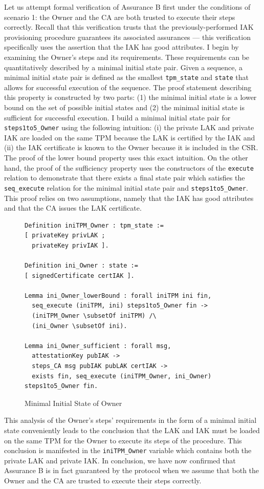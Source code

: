 \documentclass[runningheads]{llncs}
\begin{document}
Let us attempt formal verification of Assurance B first under the conditions of scenario 1: the Owner and the CA are both trusted to execute their steps correctly. Recall that this verification trusts that the previously-performed IAK provisioning procedure guarantees its associated assurances --- this verification specifically uses the assertion that the IAK has good attributes.
I begin by examining the Owner's steps and its requirements. These requirements can be quantitatively described by a minimal initial state pair. Given a sequence, a minimal initial state pair is defined as the smallest \verb|tpm_state| and \verb|state| that allows for successful execution of the sequence. The proof statement describing this property is constructed by two parts: (1) the minimal initial state is a lower bound on the set of possible initial states and (2) the minimal initial state is sufficient for successful execution. I build a minimal initial state pair for \verb|steps1to5_Owner| using the following intuition: (i) the private LAK and private IAK are loaded on the same TPM because the LAK is certified by the IAK and (ii) the IAK certificate is known to the Owner because it is included in the CSR.  
The proof of the lower bound property uses this exact intuition.
On the other hand, the proof of the sufficiency property uses the constructors of the \verb|execute| relation to demonstrate that there exists a final state pair which satisfies the \verb|seq_execute| relation for the minimal initial state pair and \verb|steps1to5_Owner|. This proof relies on two assumptions, namely that the IAK has good attributes and that the CA issues the LAK certificate.
\begin{figure}[h]
\begin{lstlisting}[language=Coq]
Definition iniTPM_Owner : tpm_state :=
[ privateKey privLAK ;
  privateKey privIAK ].

Definition ini_Owner : state :=
[ signedCertificate certIAK ].

Lemma ini_Owner_lowerBound : forall iniTPM ini fin,
  seq_execute (iniTPM, ini) steps1to5_Owner fin ->
  (iniTPM_Owner \subsetOf iniTPM) /\
  (ini_Owner \subsetOf ini).

Lemma ini_Owner_sufficient : forall msg,
  attestationKey pubIAK ->
  steps_CA msg pubIAK pubLAK certIAK ->
  exists fin, seq_execute (iniTPM_Owner, ini_Owner) steps1to5_Owner fin.
\end{lstlisting}
\caption{Minimal Initial State of Owner}
\end{figure}
This analysis of the Owner's steps' requirements in the form of a minimal initial state conveniently leads to the conclusion that the LAK and IAK must be loaded on the same TPM for the Owner to execute its steps of the procedure. This conclusion is manifested in the \verb|iniTPM_Owner| variable which contains both the private LAK and private IAK. In conclusion, we have now confirmed that Assurance B is in fact guaranteed by the protocol when we assume that both the Owner and the CA are trusted to execute their steps correctly.
\end{document}
